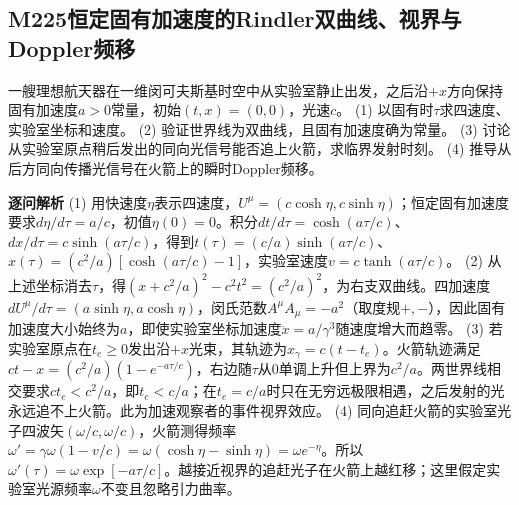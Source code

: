 \subsection*{M225\quad 恒定固有加速度的Rindler双曲线、视界与Doppler频移}
一艘理想航天器在一维闵可夫斯基时空中从实验室静止出发，之后沿$+x$方向保持固有加速度$a>0$常量，初始$(t,x)=(0,0)$，光速$c$。
(1) 以固有时$\tau$求四速度、实验室坐标和速度。
(2) 验证世界线为双曲线，且固有加速度确为常量。
(3) 讨论从实验室原点稍后发出的同向光信号能否追上火箭，求临界发射时刻。
(4) 推导从后方同向传播光信号在火箭上的瞬时Doppler频移。
\par\textbf{逐问解析}
(1) 用快速度$\eta$表示四速度，$U^\mu=(c\cosh\eta,c\sinh\eta)$；恒定固有加速度要求$d\eta/d\tau=a/c$，初值$\eta(0)=0$。积分$dt/d\tau=\cosh(a\tau/c)$、$dx/d\tau=c\sinh(a\tau/c)$，得到$t(\tau)=(c/a)\sinh(a\tau/c)$、$x(\tau)=(c^2/a)[\cosh(a\tau/c)-1]$，实验室速度$v=c\tanh(a\tau/c)$。
(2) 从上述坐标消去$\tau$，得$(x+c^2/a)^2-c^2t^2=(c^2/a)^2$，为右支双曲线。四加速度$dU^\mu/d\tau=(a\sinh\eta,a\cosh\eta)$，闵氏范数$A^\mu A_\mu=-a^2$（取度规$+,-$），因此固有加速度大小始终为$a$，即使实验室坐标加速度$\ddot x=a/\gamma^3$随速度增大而趋零。
(3) 若实验室原点在$t_e\ge0$发出沿$+x$光束，其轨迹为$x_{\gamma}=c(t-t_e)$。火箭轨迹满足$ct-x=(c^2/a)(1-e^{-a\tau/c})$，右边随$\tau$从0单调上升但上界为$c^2/a$。两世界线相交要求$ct_e<c^2/a$，即$t_e<c/a$；在$t_e=c/a$时只在无穷远极限相遇，之后发射的光永远追不上火箭。此为加速观察者的事件视界效应。
(4) 同向追赶火箭的实验室光子四波矢$(\omega/c,\omega/c)$，火箭测得频率$\omega'=\gamma\omega(1-v/c)=\omega(\cosh\eta-\sinh\eta)=\omega e^{-\eta}$。所以$\omega'(\tau)=\omega\exp[-a\tau/c]$。越接近视界的追赶光子在火箭上越红移；这里假定实验室光源频率$\omega$不变且忽略引力曲率。
\par\medskip
